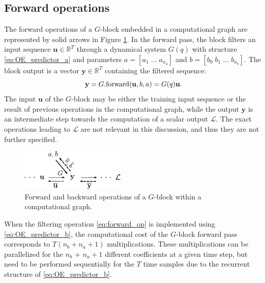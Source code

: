 \documentclass{article}
\newcommand{\q}{q} %
\newcommand{\ac}{a} %
\newcommand{\bb}{b} %
\newcommand{\tvec}[1]{\mathbf{#1}}
\newcommand{\nsamp}{T}
\newcommand{\loss}{\mathcal{L}}
\begin{document}
\subsection{Forward operations}
The forward operations of a $G$-block embedded in a computational graph are represented by solid arrows in Figure \ref{fig:backprop_tf}.
In the {forward pass}, the block filters an input sequence $\tvec{u} \in \mathbb{R}^{\nsamp}$ through a dynamical system $G(\q)$ with structure \eqref{eq:OE_predictor_a} and parameters $\ac = [\ac_1\;\dots\;\ac_{n_\ac}]$ and $\bb = [\bb_0\; \bb_1\; \dots \;\bb_{n_\bb}]$. The block output is a vector $\tvec{y} \in \mathbb{R}^{\nsamp}$ containing the filtered sequence:
\begin{equation}
\label{eq:forward_op}
\tvec{y} = G.{\rm forward}(\tvec{u}, \bb, \ac) = G(\q) \tvec{u}.
\end{equation}
The input $\tvec{u}$ of the $G$-block  may be either the training input sequence or the result of previous operations in the computational graph, while
the output $\tvec{y}$ is an intermediate step towards the computation of a scalar output $\loss$. The exact operations leading to $\loss$ are not relevant in this discussion, and thus they are not further specified.
\begin{figure}[h]
	\begin{center}
		\includegraphics[width=140pt]{fig/backprop_tf_ab.pdf}
	\end{center}
	\caption{Forward and backward operations of a $G$-block within a computational graph.}
	\label{fig:backprop_tf}
\end{figure} 

When the filtering operation \eqref{eq:forward_op} is implemented using \eqref{eq:OE_predictor_b}, the computational cost of the $G$-block forward pass corresponds to $\nsamp(n_\bb + n_\ac + 1)$ multiplications. These multiplications can be parallelized for the $n_\bb$ + $n_\ac + 1$ different coefficients at a given time step, but need to be performed sequentially for the $\nsamp$ time samples due to the recurrent structure of \eqref{eq:OE_predictor_b}.
\end{document}
